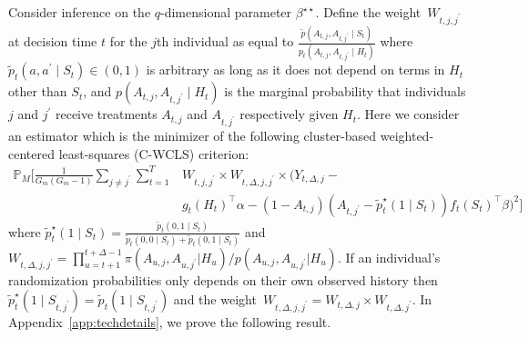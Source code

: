 \documentclass[lineno]{biometrika}
\begin{document}
Consider inference on the $q$-dimensional parameter $\beta^{\star \star}$. Define the weight~$W_{t,j, j^\prime}$ at decision time $t$ for the $j$th individual as equal to $\frac{\tilde p (A_{t,j}, A_{t,j^\prime} \mid S_t)}{p_t (A_{t,j}, A_{t,j^\prime} \mid H_t)}$ where $\tilde p_t (a, a^\prime \mid S_t)\in (0,1)$ is arbitrary as long as it does not depend on terms in $H_t$ other than $S_t$, and $p(A_{t,j}, A_{t,j^\prime} \mid H_t)$ is the marginal probability that individuals $j$ and $j^\prime$ receive treatments $A_{t,j}$ and $A_{t,j^\prime}$ respectively given $H_t$.  Here we consider an estimator which is the minimizer of the following cluster-based weighted-centered least-squares (C-WCLS) criterion:
\begin{align}
\mathbb{P}_M \bigg[ \frac{1}{G_m (G_m-1)} \sum_{j \neq j^\prime} \sum_{t=1}^T &W_{t,j, j^\prime} \times W_{t,\Delta, j,j^\prime} \times\bigg(Y_{t,\Delta,j} - \nonumber\\
&g_t (H_t)^\top \alpha - (1-A_{t,j}) (A_{t,j^\prime} - \tilde p_t^\star (1\mid S_t)) f_t(S_t)^\top \beta \bigg)^2 \bigg ] \label{eq:indirectwcls}
\end{align}
where $\tilde p_t^\star (1\mid S_t) = \frac{\tilde p_t (0,1 \mid S_t)}{\tilde p_t (0,0 \mid S_t) + \tilde p_t (0,1 \mid S_t)}$ and $W_{t,\Delta,j,j^\prime} = \prod_{u=t+1}^{t+\Delta-1} \pi(A_{u,j}, A_{u,j^\prime} | H_u) / p(A_{u,j}, A_{u,j^\prime} | H_u)$.  If an individual's randomization probabilities only depends on their own observed history then $\tilde p_t^\star (1 \mid S_{t,j^\prime}) = \tilde p_t (1 \mid S_{t,j^\prime})$ and the weight~$W_{t,\Delta, j,j^\prime} = W_{t,\Delta,j} \times W_{t, \Delta,j^\prime}$.  In Appendix~\ref{app:techdetails}, we prove the following result.
\end{document}
